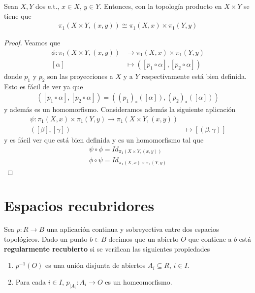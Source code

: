 \begin{teo}
    Sean $X,Y$ dos e.t., $x\in X$, $y\in Y$. Entonces, con la topología producto en $X\times Y$ se tiene que 
    \begin{gather*}
        \pi_1(X\times Y, (x,y)) \cong \pi_1(X,x) \times \pi_1(Y,y)
    \end{gather*}
    \begin{proof}
        Veamos que 
        \begin{align*}
            \phi: \pi_1(X\times Y,(x,y)) &\longrightarrow \pi_1(X,x) \times \pi_1(Y,y) \\
            [\alpha] & \longmapsto ([p_1 \circ \alpha], [p_2\circ \alpha])
        \end{align*}
        donde $p_1$ y $p_2$ son las proyecciones a $X$ y a $Y$ respectivamente está bien definida. Esto es fácil de ver ya que 
        \begin{gather*}
            ([p_1 \circ \alpha], [p_2\circ \alpha]) = ((p_1)_*([\alpha]), (p_2)_*([\alpha]))
        \end{gather*}
        y además es un homomorfismo. Consideramos además la siguiente aplicación
        \begin{align*}
            \psi: \pi_1(X,x)\times \pi_1(Y,y) \longrightarrow \pi_1(X\times Y, (x,y))\\
            ([\beta], [\gamma]) & \longmapsto [(\beta, \gamma)]
        \end{align*}
        y es fácil ver que está bien definida y es un homomorfismo tal que
        \begin{gather*}
            \psi \circ \phi = Id_{\pi_1(X\times Y,(x,y))}\\
            \phi \circ \psi = Id_{\pi_1(X,x) \times \pi_1(Y,y)}
        \end{gather*}
    \end{proof}
\end{teo}

\section{Espacios recubridores}

\begin{definicion}
    Sea $p:R\to B$ una aplicación continua y sobreyectiva entre dos espacios topológicos. Dado un punto $b\in B$ decimos que un abierto $O$ que contiene a $b$ está \textbf{regularmente recubierto} si se verifican las siguientes propiedades
    \begin{enumerate}
        \item $p^{-1}(O)$ es una unión disjunta de abiertos $A_i\subseteq R$, $i\in I$.
        \item Para cada $i\in I$, $p_{|A_i}:A_i \to O$ es un homeomorfismo.
    \end{enumerate}
\end{definicion}

